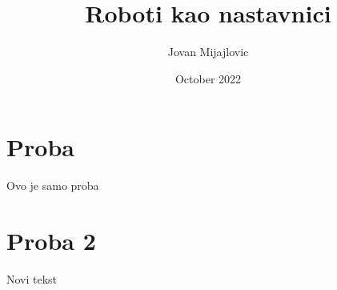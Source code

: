 \documentclass[]{article}
\title{Roboti kao nastavnici}
\author{Jovan Mijajlovic}
\date{October 2022}
\begin{document}
\maketitle

\section{Proba}
\begin{center}
    Ovo je samo proba
\end{center}

\section{Proba 2}
\begin{center}
    Novi tekst
\end{center}
\end{document}
